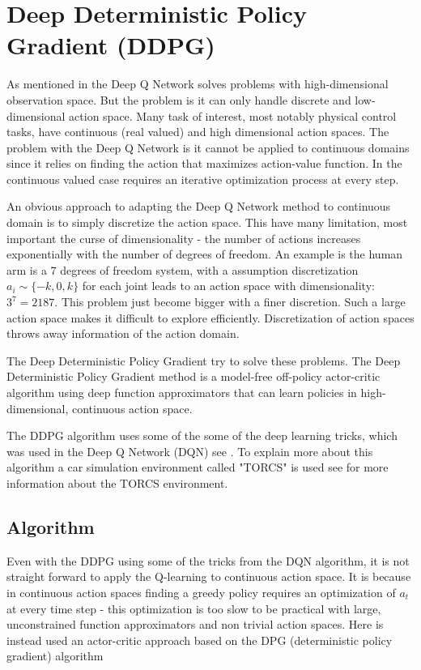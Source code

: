 \section{Deep Deterministic Policy Gradient (DDPG)}\label{DDPG}
As mentioned in  the Deep Q Network solves problems with high-dimensional observation space. But the problem is it can only handle discrete and low-dimensional action space. Many task of interest, most notably physical control tasks, have continuous (real valued) and high dimensional action spaces. The problem with the Deep Q Network is it cannot be applied to continuous domains since it relies on finding the action that maximizes action-value function. In the continuous valued case requires an iterative optimization process at every step. \cite{DBLP:journals/corr/LillicrapHPHETS15}

An obvious approach to adapting the Deep Q Network method to continuous domain is to simply discretize the action space. This have many limitation, most important the curse of dimensionality - the number of actions increases exponentially with the number of degrees of freedom. An example is the human arm is a 7 degrees of freedom system, with a assumption discretization $a_i \sim  \{-k,0,k\}$ for each joint leads to an action space with dimensionality: $3^7 = 2187$. This problem just become bigger with a finer discretion. Such a large action space makes it difficult to explore efficiently. Discretization of action spaces throws away information of the action domain.

The Deep Deterministic Policy Gradient try to solve these problems. The Deep Deterministic Policy Gradient method is a model-free off-policy actor-critic algorithm using deep function approximators that can learn policies in high-dimensional, continuous action space. 

The DDPG algorithm uses some of the some of the deep learning tricks, which was used in the Deep Q Network (DQN) see . To explain more about this algorithm a car simulation environment called "TORCS" is used see  for more information about the TORCS environment. \cite{DDPG_Torcs} 

\subsection{Algorithm}
Even with the DDPG using some of the tricks from the DQN algorithm, it is not straight forward to apply the Q-learning to continuous action space. It is because in continuous action spaces finding a greedy policy requires an optimization of \textit{$a_t$} at every time step - this optimization is too slow to be practical with large, unconstrained function approximators and non trivial action spaces. Here is instead used an actor-critic approach based on the DPG (deterministic policy gradient) algorithm \cite{DBLP:conf/icml/SilverLHDWR14}

